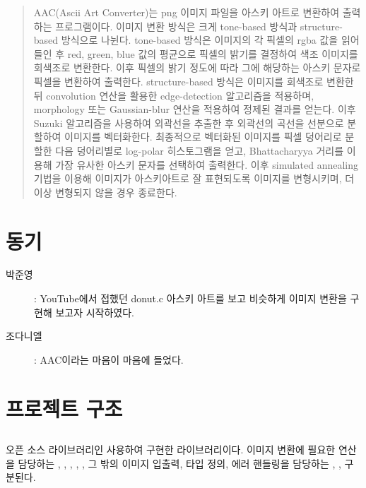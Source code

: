 \documentclass[conference]{IEEEtran}
\begin{document}
\maketitle

\begin{abstract}
AAC(Ascii Art Converter)는 png 이미지 파일을 아스키 아트로 변환하여 출력하는 프로그램이다.
이미지 변환 방식은 크게 tone-based 방식과 structure-based 방식으로 나뉜다.
tone-based 방식은 이미지의 각 픽셀의 rgba 값을 읽어들인 후 red, green, blue 값의 평균으로 픽셀의 밝기를 결정하여 색조 이미지를 회색조로 변환한다.
이후 픽셀의 밝기 정도에 따라 그에 해당하는 아스키 문자로 픽셀을 변환하여 출력한다.
structure-based 방식은 이미지를 회색조로 변환한 뒤 convolution 연산을 활용한 edge-detection 알고리즘을 적용하며, morphology 또는 Gaussian-blur 연산을 적용하여 정제된 결과를 얻는다.
이후 Suzuki 알고리즘을 사용하여 외곽선을 추출한 후 외곽선의 곡선을 선분으로 분할하여 이미지를 벡터화한다.
최종적으로 벡터화된 이미지를 픽셀 덩어리로 분할한 다음 덩어리별로 log-polar 히스토그램을 얻고, Bhattacharyya 거리를 이용해 가장 유사한 아스키 문자를 선택하여 출력한다.
이후 simulated annealing 기법을 이용해 이미지가 아스키아트로 잘 표현되도록 이미지를 변형시키며, 더이상 변형되지 않을 경우 종료한다.
\end{abstract}

\section{동기}
\begin{description}
    \item[박준영]: YouTube에서 접했던 donut.c\cite{b1} 아스키 아트를 보고 비슷하게 이미지 변환을 구현해 보고자 시작하였다.
    \item[조다니엘]\hspace{1em}: AAC이라는 마음이 마음에 들었다.
\end{description}

\section{프로젝트 구조}

\subsection{\eg}

 오픈 소스 라이브러리인   사용하여 구현한 라이브러리이다.
 이미지 변환에 필요한 연산을 담당하는 \egGeometry, \egMath, \egMethods, \egOperators, \egProcessing,  그 밖의 이미지 입출력, 타입 정의, 에러 핸들링을 담당하는 \egLoader, \egTypes,  구분된다.
\end{document}
